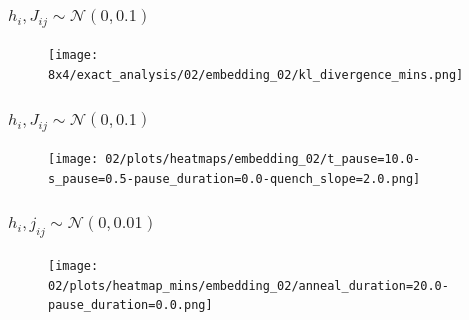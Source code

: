 \documentclass{beamer}
\begin{document}

\begin{frame}
    \frametitle{\( h_i, J_{ij} \sim \mathcal{N}(0, 0.1) \)}
    \begin{figure}
        \texttt{[image: 8x4/exact\_analysis/02/embedding\_02/kl\_divergence\_mins.png]}
    \end{figure}
\end{frame}
\begin{frame}
    \frametitle{\( h_i, J_{ij} \sim \mathcal{N}(0, 0.1) \)}
    \begin{figure}
        \texttt{[image: 02/plots/heatmaps/embedding\_02/t\_pause=10.0-s\_pause=0.5-pause\_duration=0.0-quench\_slope=2.0.png]}
    \end{figure}
\end{frame}
\begin{frame}
    \frametitle{\( h_i, j_{ij} \sim \mathcal{N}(0, 0.01) \)}
    \begin{figure}
        \texttt{[image: 02/plots/heatmap\_mins/embedding\_02/anneal\_duration=20.0-pause\_duration=0.0.png]}
    \end{figure}
\end{frame}
\end{document}
